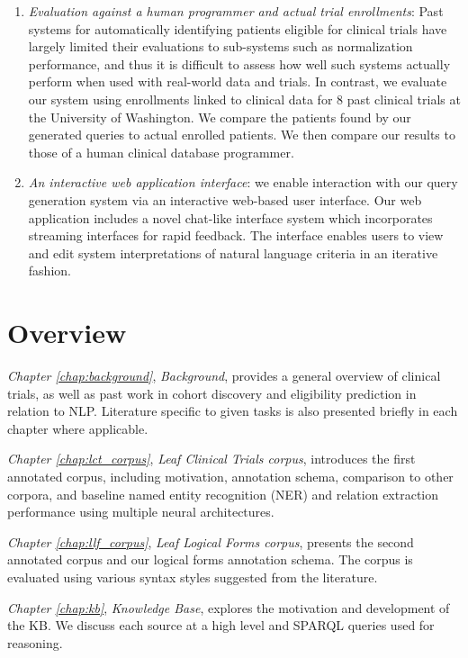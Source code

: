 \documentclass[../main.tex]{subfiles}
\begin{document}
\begin{enumerate}
    \item \textit{Evaluation against a human programmer and actual trial enrollments}: Past systems for automatically identifying patients eligible for clinical trials have largely limited their evaluations to sub-systems such as normalization performance, and thus it is difficult to assess how well such systems actually perform when used with real-world data and trials. In contrast, we evaluate our system using enrollments linked to clinical data for 8 past clinical trials at the University of Washington. We compare the patients found by our generated queries to actual enrolled patients. We then compare our results to those of a human clinical database programmer.
    \item \textit{An interactive web application interface}: we enable interaction with our query generation system via an interactive web-based user interface. Our web application includes a novel chat-like interface system which incorporates streaming interfaces for rapid feedback. The interface enables users to view and edit system interpretations of natural language criteria in an iterative fashion.
\end{enumerate}

\section{Overview}

\textit{Chapter \ref{chap:background}}, \textit{Background}, provides a general overview of clinical trials, as well as past work in cohort discovery and eligibility prediction in relation to NLP. Literature specific to given tasks is also presented briefly in each chapter where applicable. 

\textit{Chapter \ref{chap:lct_corpus}}, \textit{Leaf Clinical Trials corpus}, introduces the first annotated corpus, including motivation, annotation schema, comparison to other corpora, and baseline named entity recognition (NER) and relation extraction performance using multiple neural architectures.

\textit{Chapter \ref{chap:llf_corpus}}, \textit{Leaf Logical Forms corpus}, presents the second annotated corpus and our logical forms annotation schema. The corpus is evaluated using various syntax styles suggested from the literature.

\textit{Chapter \ref{chap:kb}}, \textit{Knowledge Base}, explores the motivation and development of the KB. We discuss each source at a high level and SPARQL queries used for reasoning.
\end{document}
